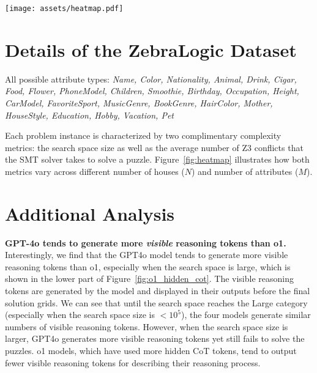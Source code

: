 \begin{figure*}[h!]
    \centering
    \texttt{[image: assets/heatmap.pdf]}
    \vspace{-1mm}
    \caption{
    \small  Heatmaps illustrating puzzle complexity metrics across different ZebraLogic problem sizes. The left heatmap represents the log-scaled search space size, categorized from Small to X-Large based on the grid configurations (houses × attributes). The right heatmap shows the average number of Z3 conflicts encountered during solving, with higher counts indicating greater logical complexity.}    %
    \label{fig:heatmap}
\end{figure*}

\section{Details of the ZebraLogic Dataset}
\label{app:details}
All possible attribute types:
\textit{Name, Color, Nationality, Animal, Drink, Cigar, Food, Flower, PhoneModel, Children, Smoothie, Birthday, Occupation, Height, CarModel, FavoriteSport, MusicGenre, BookGenre, HairColor, Mother, HouseStyle, Education, Hobby, Vacation, Pet}



Each problem instance is characterized by two complimentary complexity metrics: the search space size as well as the average number of Z3 conflicts that the SMT solver takes to solve a puzzle. Figure~\ref{fig:heatmap} illustrates how both metrics vary across different number of houses ($N$) and number of attributes ($M$).



\section{Additional Analysis}


\textbf{GPT-4o tends to generate more \textit{visible} reasoning tokens than o1.}
Interestingly, we find that the GPT4o model tends to generate more visible reasoning tokens than o1, especially when the search space is large, which is shown in the lower part of Figure~\ref{fig:o1_hidden_cot}.
The visible reasoning tokens are generated by the model and displayed in their outputs before the final solution grids.
We can see that until the search space reaches the Large category (especially when the search space size is $<10^5$), the four models generate similar numbers of visible reasoning tokens. However, when the search space size is larger, GPT4o generates more visible reasoning tokens yet still fails to solve the puzzles.
o1 models, which have used more hidden CoT tokens, tend to output fewer visible reasoning tokens for describing their reasoning process.


